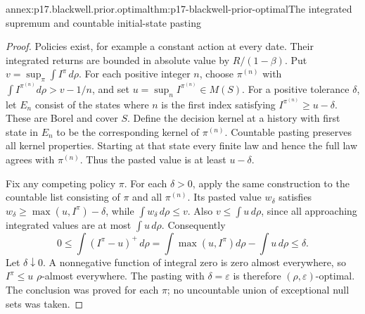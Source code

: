 \begin{annexitem}{annex:p17.blackwell.prior.optimal}{thm:p17-blackwell-prior-optimal}{The integrated supremum and countable initial-state pasting}
\begin{proof}
Policies exist, for example a constant action at every date.
Their integrated returns are bounded in absolute value by
\(R/(1-\beta)\). Put \(v=\sup_\pi\int I^\pi\,d\rho\).
For each positive integer \(n\), choose \(\pi^{(n)}\) with
\(\int I^{\pi^{(n)}}d\rho>v-1/n\), and set
\(u=\sup_n I^{\pi^{(n)}}\in M(S)\).
For a positive tolerance \(\delta\), let \(E_n\) consist of
the states where \(n\) is the first index satisfying
\(I^{\pi^{(n)}}\geq u-\delta\). These are Borel and cover
\(S\). Define the decision kernel at a history with first
state in \(E_n\) to be the corresponding kernel of
\(\pi^{(n)}\). Countable pasting preserves all kernel
properties. Starting at that state every finite law and
hence the full law agrees with \(\pi^{(n)}\).
Thus the pasted value is at least \(u-\delta\).

Fix any competing policy \(\pi\). For each \(\delta>0\),
apply the same construction to the countable list consisting
of \(\pi\) and all \(\pi^{(n)}\). Its pasted value \(w_\delta\)
satisfies \(w_\delta\geq\max(u,I^\pi)-\delta\), while
\(\int w_\delta\,d\rho\leq v\).
Also \(v\leq\int u\,d\rho\), since all approaching integrated
values are at most \(\int u\,d\rho\). Consequently
\[
 0\leq\int (I^\pi-u)^+\,d\rho
     =\int\max(u,I^\pi)d\rho-\int u\,d\rho\leq\delta.
\]
Let \(\delta\downarrow0\). A nonnegative function of integral
zero is zero almost everywhere, so \(I^\pi\leq u\)
\(\rho\)-almost everywhere. The pasting with
\(\delta=\varepsilon\) is therefore
\((\rho,\varepsilon)\)-optimal. The conclusion was proved
for each \(\pi\); no uncountable union of exceptional null
sets was taken.
\end{proof}
\end{annexitem}

